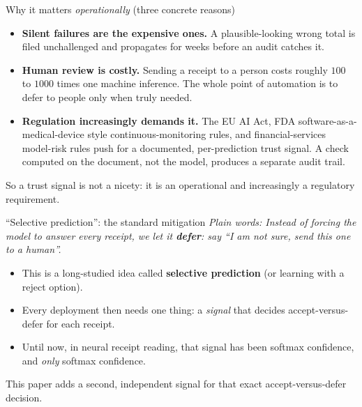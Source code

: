 \documentclass[aspectratio=169]{beamer}
\newcommand{\keybox}[1]{\begin{center}\colorbox{grey!15}{\parbox{0.92\linewidth}{\centering #1}}\end{center}}
\newcommand{\plain}[1]{\textit{\textcolor{sig}{Plain words:} #1}}
\begin{document}
\begin{frame}{Why it matters \emph{operationally} (three concrete reasons)}
\begin{itemize}
\item \textbf{Silent failures are the expensive ones.} A
plausible-looking wrong total is filed unchallenged and propagates
for weeks before an audit catches it.
\item \textbf{Human review is costly.} Sending a receipt to a person
costs roughly $100$ to $1000$ times one machine inference. The whole
point of automation is to defer to people only when truly needed.
\item \textbf{Regulation increasingly demands it.} The EU AI Act,
FDA software-as-a-medical-device style continuous-monitoring rules,
and financial-services model-risk rules push for a documented,
per-prediction trust signal. A check computed on the document, not
the model, produces a separate audit trail.
\end{itemize}
\keybox{So a trust signal is not a nicety: it is an operational and
increasingly a regulatory requirement.}
\end{frame}

\begin{frame}{``Selective prediction'': the standard mitigation}
\plain{Instead of forcing the model to answer every receipt, we let
it \textbf{defer}: say ``I am not sure, send this one to a human''.}
\vspace{0.6em}
\begin{itemize}
\item This is a long-studied idea called \textbf{selective
prediction} (or learning with a reject option).
\item Every deployment then needs one thing: a \emph{signal} that
decides accept-versus-defer for each receipt.
\item Until now, in neural receipt reading, that signal has been
softmax confidence, and \emph{only} softmax confidence.
\end{itemize}
\keybox{This paper adds a second, independent signal for that exact
accept-versus-defer decision.}
\end{frame}

\end{document}
